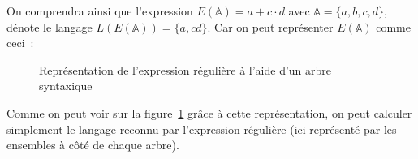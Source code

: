 \begin{example}
    On comprendra ainsi que l'expression \(E(\mathbb{A}) = a+c \cdot d\) avec
    \(\mathbb{A} = \{a, b, c, d\}\), dénote le langage \(L(E(\mathbb{A})) = \{a,
    cd\}\). Car on peut représenter \(E(\mathbb{A})\) comme ceci~:

    \begin{figure}[H]
        \centering
        \captionsetup{type=figure,justification=centering}
        \caption{
            Représentation de l'expression régulière à l'aide d'un arbre syntaxique
        }\label{fig:arbre_syn}
    \end{figure}

    Comme on peut voir sur la figure~\ref{fig:arbre_syn} grâce à cette
    représentation, on peut calculer simplement le langage reconnu par l'expression
    régulière (ici représenté par les ensembles à côté de chaque arbre).
\end{example}

\vphantom{}

